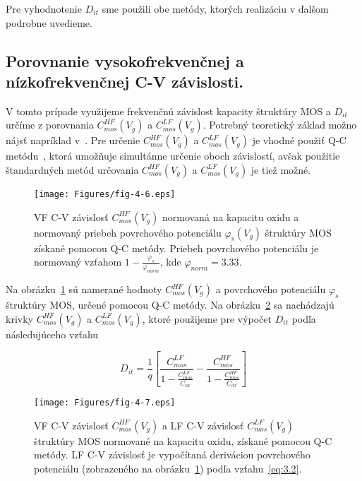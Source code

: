 Pre vyhodnotenie $D_{it}$ sme použili obe metódy, ktorých realizáciu v
ďalšom podrobne uvedieme.

\subsection{Porovnanie vysokofrekvenčnej a nízkofrekvenčnej C-V závislosti.}\label{sec:4.2.1}

V tomto prípade využijeme frekvenčnú závislost kapacity štruktúry MOS
a $D_{it}$ určíme z porovnania $C_{mos}^{HF}(V_{g})$ a
$C_{mos}^{LF}(V_{g})$. Potrebný teoretický základ možno nájsť
napríklad v~\cite{I.1}.  Pre určenie $C_{mos}^{HF}(V_{g})$ a
$C_{mos}^{LF}(V_{g})$ je vhodné použiť Q-C metódu~\cite{3.4, 3.6, 3.7,
  3.8}, ktorá umožňuje simultánne určenie oboch závislostí, avšak
použitie štandardných metód určovania $C_{mos}^{HF}(V_{g})$ a
$C_{mos}^{LF}(V_{g})$ je tiež možné.

\begin{figure}[h!]\centering
  \texttt{[image: Figures/fig-4-6.eps]}
  \caption[VF C-V závislosť $C_{mos}^{HF}(V_{g})$ a priebeh
    povrchového potenciálu $\varphi_{s}(V_{g})$ štruktúry MOS získané
    pomocou Q-C metódy]{VF C-V závislosť $C_{mos}^{HF}(V_{g})$
    normovaná na kapacitu oxidu a normovaný priebeh povrchového
    potenciálu $\varphi_{s}(V_{g})$ štruktúry MOS získané pomocou Q-C
    metódy.  Priebeh povrchového potenciálu je normovaný vzťahom
    $1-\frac{\varphi_{s}}{\varphi_{norm}}$, kde
    $\varphi_{norm}=3.33$.}\label{fig:4.6}
\end{figure}

Na obrázku~\ref{fig:4.6} sú namerané hodnoty $C_{mos}^{HF}(V_{g})$ a
povrchového potenciálu $\varphi_{s}$ štruktúry MOS, určené pomocou Q-C
metódy. Na obrázku~\ref{fig:4.7} sa nachádzajú krivky
$C_{mos}^{HF}(V_{g})$ a $C_{mos}^{LF}(V_{g})$, ktoré použijeme pre
výpočet $D_{it}$ podľa následujúceho vzťahu~\cite{4.15}

\begin{equation}\label{eq:4.15}
  D_{it} = {\frac{1}{q}} {\left[\frac{C_{mos}^{LF}}{1-\frac{C_{mos}^{LF}}{C_{ox}}}-\frac{C_{mos}^{HF}}{1-\frac{C_{mos}^{HF}}{C_{ox}}}\right]}
\end{equation}

\begin{figure}[h!]\centering
  \texttt{[image: Figures/fig-4-7.eps]}
  \caption[VF C-V závislosť $C_{mos}^{HF}(V_{g})$ a LF C-V závislosť
    $C_{mos}^{LF}(V_{g})$ štruktúry MOS normované na kapacitu oxidu,
    získané pomocou Q-C metódy]{VF C-V závislosť $C_{mos}^{HF}(V_{g})$
    a LF C-V závislosť $C_{mos}^{LF}(V_{g})$ štruktúry MOS normované
    na kapacitu oxidu, získané pomocou Q-C metódy.  LF C-V závislosť
    je vypočítaná deriváciou povrchového potenciálu (zobrazeného na
    obrázku~\ref{fig:4.6}) podľa vzťahu~\ref{eq:3.2}.}\label{fig:4.7}
\end{figure}

